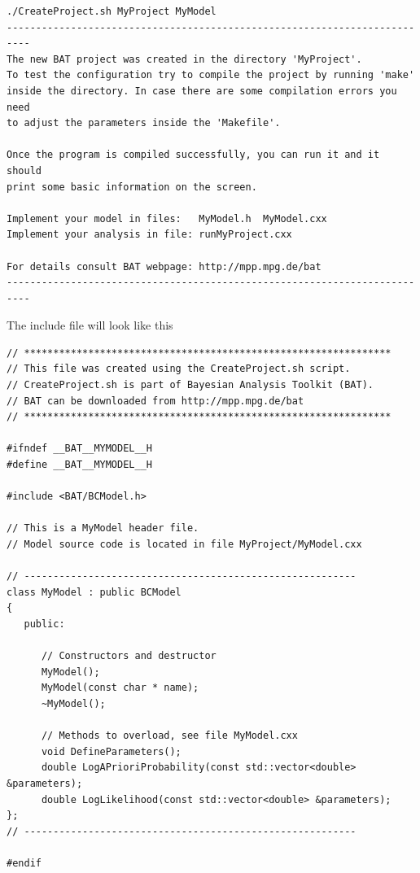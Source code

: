 \documentclass[11pt, a4paper]{article}
\begin{document}
\begin{verbatim}
./CreateProject.sh MyProject MyModel
--------------------------------------------------------------------------
The new BAT project was created in the directory 'MyProject'.
To test the configuration try to compile the project by running 'make'
inside the directory. In case there are some compilation errors you need
to adjust the parameters inside the 'Makefile'.

Once the program is compiled successfully, you can run it and it should
print some basic information on the screen.

Implement your model in files:   MyModel.h  MyModel.cxx
Implement your analysis in file: runMyProject.cxx

For details consult BAT webpage: http://mpp.mpg.de/bat
--------------------------------------------------------------------------
\end{verbatim}

The include file will look like this
%
\begin{verbatim}
// ***************************************************************
// This file was created using the CreateProject.sh script.
// CreateProject.sh is part of Bayesian Analysis Toolkit (BAT).
// BAT can be downloaded from http://mpp.mpg.de/bat
// ***************************************************************

#ifndef __BAT__MYMODEL__H
#define __BAT__MYMODEL__H

#include <BAT/BCModel.h>

// This is a MyModel header file.
// Model source code is located in file MyProject/MyModel.cxx

// ---------------------------------------------------------
class MyModel : public BCModel
{
   public:

      // Constructors and destructor
      MyModel();
      MyModel(const char * name);
      ~MyModel();

      // Methods to overload, see file MyModel.cxx
      void DefineParameters();
      double LogAPrioriProbability(const std::vector<double> &parameters);
      double LogLikelihood(const std::vector<double> &parameters);
};
// ---------------------------------------------------------

#endif
\end{verbatim}
\end{document}
